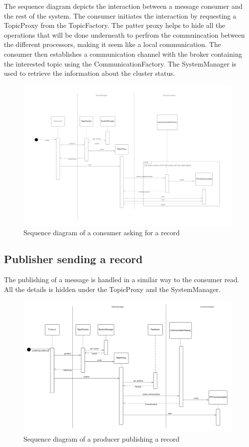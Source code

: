 The sequence diagram depicts the interaction between a message consumer and
the rest of the system. The consumer initiates the interaction by requesting
a TopicProxy from the TopicFactory.
The patter proxy helps to hide all the operations that will be done underneath
to perfrom the commuincation between the different processors, making it seem
like a local communication.
The consumer then establishes a communication channel with the broker
containing the interested topic using the CommunicationFactory.
The SystemManager is used to retrieve the information about the cluster status.

\begin{figure}[H]
    \centering
    \includegraphics[width=1.0\textwidth]{Figures/sequence_diagram_consumer_poll.png}
    \caption{Sequence diagram of a consumer asking for a record}
\end{figure}

\subsection{Publisher sending a record}

The publishing of a message is handled in a similar way to the consumer read.
All the details is hidden under the TopicProxy and the SystemManager.

\begin{figure}[ht]
    \centering
    \includegraphics[width=1.0\textwidth]{Figures/sequence_diagram_producer.png}
    \caption{Sequence diagram of a producer publishing a record}
\end{figure}

